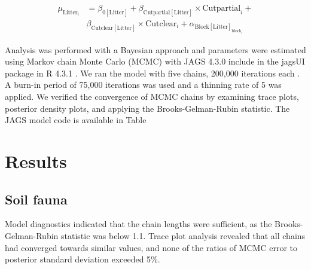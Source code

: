 \begin{align}
  \mu_{\text{Litter}_i} &= \beta_{0[\text{Litter}]} + \beta_{\text{Cutpartial}[\text{Litter}]} \times \text{Cutpartial}_{i} + \nonumber\\
  & \beta_{\text{Cutclear}[\text{Litter}]} \times \text{Cutclear}_{i} + \alpha_{\text{Block}[\text{Litter}]_{\text{block}_i}} \nonumber
\end{align}


Analysis was performed with a Bayesian approach and parameters were estimated using Markov chain Monte Carlo (MCMC) with JAGS 4.3.0 include in the jagsUI package in R 4.3.1 \citep{lunnBUGSProjectEvolution2009,kellnerJagsUIWrapperRjags2024,rcoreteamLanguageEnvironmentStatistical2020}. 
We ran the model with five chains, 200,000 iterations each \citep{gelmanUnderstandingPredictiveInformation2014}. A burn-in period of 75,000 iterations was used and a thinning rate of 5 was applied. 
We verified the convergence of MCMC chains by examining trace plots, posterior density plots, and applying the Brooks-Gelman-Rubin statistic. 
The JAGS model code is available in Table

\clearpage

\section*{Results}
\label{sec:results1}


\subsection*{Soil fauna}
\label{subsec:taxa}

Model diagnostics indicated that the chain lengths were sufficient, as the Brooks-Gelman-Rubin statistic was below 1.1. 
Trace plot analysis revealed that all chains had converged towards similar values, and none of the ratios of MCMC error to posterior standard deviation exceeded 5\%.

\vspace{10pt}

